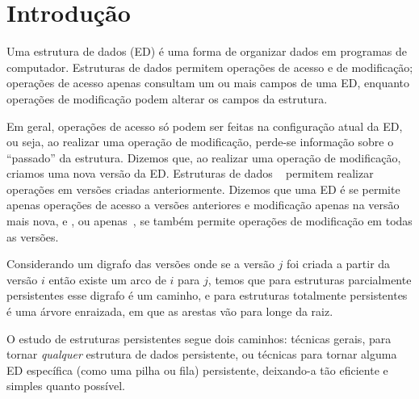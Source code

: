 \documentclass[main.tex]{subfiles}
\begin{document}
\setcounter{secnumdepth}{0}

\chapter*{Introdução}

Uma estrutura de dados (ED) é uma forma de organizar dados em programas de computador. Estruturas de dados permitem operações de acesso e de modificação; operações de acesso apenas consultam um ou mais campos de uma ED, enquanto operações de modificação podem alterar os campos da estrutura.

Em geral, operações de acesso só podem ser feitas na configuração atual da ED, ou seja, ao realizar uma operação de modificação, perde-se informação sobre o ``passado'' da estrutura. Dizemos que, ao realizar uma operação de modificação, criamos uma nova versão da ED. Estruturas de dados ~\cite{DriscollSST1989} permitem realizar operações em versões criadas anteriormente. Dizemos que uma ED é  se permite apenas operações de acesso a versões anteriores e modificação apenas na versão mais nova, e , ou apenas~, se também permite operações de modificação em todas as versões.

Considerando um digrafo das versões onde se a versão $j$ foi criada a partir da versão $i$ então existe um arco de $i$ para $j$, temos que para estruturas parcialmente persistentes esse digrafo é um caminho, e para estruturas totalmente persistentes é uma árvore enraizada, em que as arestas vão para longe da raiz.

O estudo de estruturas persistentes segue dois caminhos: técnicas gerais, para tornar \emph{qualquer} estrutura de dados persistente, ou técnicas para tornar alguma ED específica (como uma pilha ou fila) persistente, deixando-a tão eficiente e simples quanto possível.

\setcounter{secnumdepth}{1}
\end{document}
